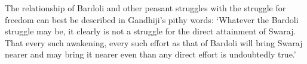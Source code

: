 \begin{multicols}{2}
The relationship of Bardoli and other peasant struggles with the struggle for freedom can best be described in Gandhiji's pithy words: `Whatever the Bardoli struggle may be, it clearly is not a struggle for the direct attainment of Swaraj. That every such awakening, every such effort as that of Bardoli will bring Swaraj nearer and may bring it nearer even than any direct effort is undoubtedly true.'
\end{multicols}
